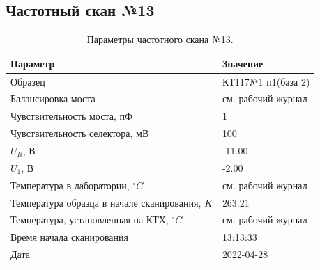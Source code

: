 \subsection{Частотный скан №13}
\begin{table}[!ht]
    \centering
    \caption{Параметры частотного скана №13.}
    \begin{tabular}{|l|l|}
        \hline
        Параметр                                       & Значение                  \\ \hline
        Образец                                        & КТ117№1 п1(база 2)        \\ \hline
        Балансировка моста                             & см. рабочий журнал        \\ \hline
        Чувствительность моста, пФ                     & 1                         \\ \hline
        Чувствительность селектора, мВ                 & 100                       \\ \hline
        $U_R$, В                                       & -11.00                    \\ \hline
        $U_1$, В                                       & -2.00                     \\ \hline
        Температура в лаборатории, $^\circ C$          & см. рабочий журнал        \\ \hline
        Температура образца в начале сканирования, $K$ & 263.21                    \\ \hline
        Температура, установленная на КТХ, $^\circ C$  & см. рабочий журнал        \\ \hline
        Время начала сканирования                      & 13:13:33                  \\ \hline
        Дата                                           & 2022-04-28                \\ \hline
    \end{tabular}
    \label{table:frequency_scan_13}
\end{table}

